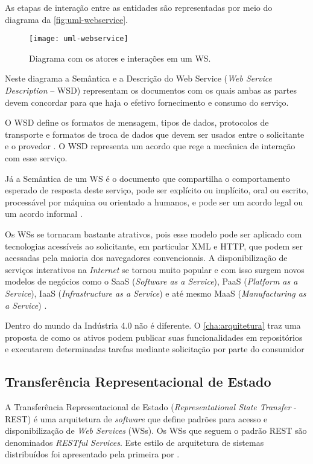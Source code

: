 As etapas de interação entre as entidades são representadas por meio do diagrama da \autoref{fig:uml-webservice}.

\begin{figure}[htb]
	\centering
	\texttt{[image: uml-webservice]}
	\caption{Diagrama com os atores e interações em um WS.}
	\label{fig:uml-webservice}
\end{figure}

Neste diagrama a Semântica e a Descrição do Web Service (\textit{Web Service Description} -- WSD) representam os documentos com os quais ambas as partes devem concordar para que haja o efetivo fornecimento e consumo do serviço.

O WSD define os formatos de mensagem, tipos de dados, protocolos de transporte e formatos de troca de dados que devem ser usados entre o solicitante e o provedor \cite{booth2004webservice}. O WSD representa um acordo que rege a mecânica de interação com esse serviço.

Já a Semântica de um WS é o documento que compartilha o comportamento esperado de resposta deste serviço, pode ser explícito ou implícito, oral ou escrito, processável por máquina ou orientado a humanos, e pode ser um acordo legal ou um acordo informal \cite{booth2004webservice}.

Os WSs se tornaram bastante atrativos, pois esse modelo pode ser aplicado com tecnologias acessíveis ao solicitante, em particular XML e HTTP, que podem ser acessadas pela maioria dos navegadores convencionais. A disponibilização de serviços interativos na \textit{Internet} se tornou muito popular e com isso surgem novos modelos de negócios como o SaaS (\textit{Software as a Service}), PaaS (\textit{Platform as a Service}), IaaS (\textit{Infrastructure as a Service}) e até mesmo MaaS (\textit{Manufacturing as a Service}) \cite{annunziata2019maas, nichols2020maas, siepen2019maas}.

Dentro do mundo da Indústria 4.0 não é diferente. O \autoref{cha:arquitetura} traz uma proposta de como os ativos podem publicar suas funcionalidades em repositórios e executarem determinadas tarefas mediante solicitação por parte do consumidor

\subsection{Transferência Representacional de Estado}

A Transferência Representacional de Estado (\textit{Representational State Transfer} - REST) é uma arquitetura de \textit{software} que define padrões para acesso e disponibilização de \textit{Web Services} (WSs). Os WSs que seguem o padrão REST são denominados \textit{RESTful Services}. Este estilo de arquitetura de sistemas distribuídos foi apresentado pela primeira por  .

